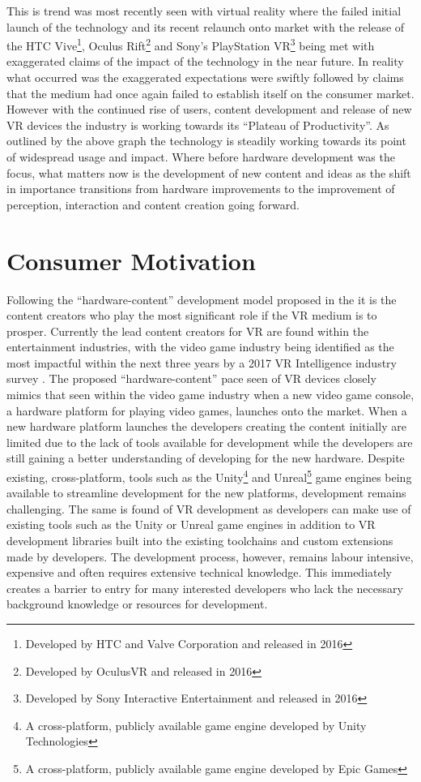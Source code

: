 \documentclass{l4proj}
\begin{document}
This is trend was most recently seen with virtual reality where the failed initial launch of the technology and its recent relaunch onto market with the release of the HTC Vive\footnote{Developed by HTC and Valve Corporation and released in 2016}, Oculus Rift\footnote{Developed by OculusVR and released in 2016} and Sony's PlayStation VR\footnote{Developed by Sony Interactive Entertainment and released in 2016} being met with exaggerated claims of the impact of the technology in the near future. In reality what occurred was the exaggerated expectations were swiftly followed by claims that the medium had once again failed to establish itself on the consumer market. However with the continued rise of users, content development and release of new VR devices the industry is working towards its ``Plateau of Productivity''. As outlined by the above graph the technology is steadily working towards its point of widespread usage and impact. Where before hardware development was the focus, what matters now is the development of new content and ideas as the shift in importance transitions from hardware improvements to the improvement of perception, interaction and content creation going forward. 

\section{Consumer Motivation}
\label{sec:introductionmotivation}
Following the ``hardware-content'' development model proposed in the \cite{WhitePaper} it is the content creators who play the most significant role if the VR medium is to prosper. Currently the lead content creators for VR are found within the entertainment industries, with the video game industry being identified as the most impactful within the next three years by a 2017 VR Intelligence industry survey \cite{VRX}. The proposed ``hardware-content'' pace seen of VR devices closely mimics that seen within the video game industry when a new video game console, a hardware platform for playing video games, launches onto the market. When a new hardware platform launches the developers creating the content initially are limited due to the lack of tools available for development while the developers are still gaining a better understanding of developing for the new hardware. Despite existing, cross-platform, tools such as the Unity\footnote{A cross-platform, publicly available game engine developed by Unity Technologies} and Unreal\footnote{A cross-platform, publicly available game engine developed by Epic Games} game engines being available to streamline development for the new platforms, development remains challenging. The same is found of VR development as developers can make use of existing tools such as the Unity or Unreal game engines in addition to VR development libraries built into the existing toolchains and custom extensions made by developers. The development process, however, remains labour intensive, expensive and often requires extensive technical knowledge. This immediately creates a barrier to  entry for many interested developers who lack the necessary background knowledge or resources for development. 
\end{document}
